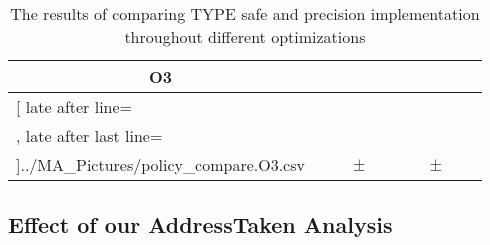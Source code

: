\begin{table}[!htbp]
{\begin{tabular}{l|c|rcl|c|rcl|c}
\multicolumn{1}{c}{\bfseries O3}
	\\\midrule
	\csvreader[ late after line=\\, late after last line=\\\bottomrule]{../MA_Pictures/policy_compare.O3.csv}{
}
	{\csvcolii  &  \csvcoliii & \csvcolxiii & $\pm$ & \csvcolxiv & \csvcolxv & \csvcolxvi & $\pm$ & \csvcolxvii& \csvcolxviii}%

    	\end{tabular}
}
		\caption {The results of comparing TYPE safe and precision implementation throughout different optimizations}
		\label{tbl:policycomp}
\end{table}

\newpage


\subsection{Effect of our AddressTaken Analysis}
\label{subsection:effectivenessaddresstaken}


